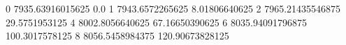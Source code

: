 0 7935.63916015625 0.0
1 7943.6572265625 8.01806640625
2 7965.21435546875 29.5751953125
4 8002.8056640625 67.16650390625
6 8035.94091796875 100.3017578125
8 8056.5458984375 120.90673828125

